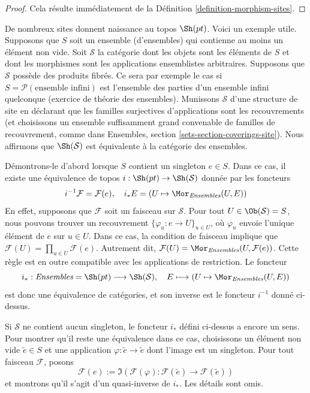 \begin{proof}
Cela résulte immédiatement de la Définition \ref{definition-morphism-sites}.
\end{proof}

\begin{remark}
\label{remark-pt-topos}
De nombreux sites donnent naissance au topos $\Sh(pt)$.
Voici un exemple utile. Supposons que $S$ soit un ensemble (d’ensembles)
qui contienne au moins un élément non vide. Soit $\mathcal{S}$ la
catégorie dont les objets sont les éléments de $S$ et dont les morphismes sont
les applications ensemblistes arbitraires. Supposons que $\mathcal{S}$ possède des produits fibrés.
Ce sera par exemple le cas si $S = \mathcal{P}(\text{ensemble infini})$
est l’ensemble des parties d’un ensemble infini quelconque (exercice de théorie des ensembles).
Munissons $\mathcal{S}$ d’une structure de site en déclarant que
les familles surjectives d’applications sont les recouvrements (et choisissons
un ensemble suffisamment grand convenable de familles de recouvrement, comme dans
Ensembles, section \ref{sets-section-coverings-site}).
Nous affirmons que $\Sh(\mathcal{S})$ est équivalente à la catégorie des
ensembles.

\medskip\noindent
Démontrons-le d’abord lorsque $S$ contient un singleton $e \in S$.
Dans ce cas, il existe une équivalence de topos
$i : \Sh(pt) \to \Sh(\mathcal{S})$ donnée par
les foncteurs
\begin{equation}
\label{equation-sheaves-pt-sets}
i^{-1}\mathcal{F} = \mathcal{F}(e), \quad
i_*E = (U \mapsto \Mor_{\textit{Ensembles}}(U, E))
\end{equation}
En effet, supposons que $\mathcal{F}$ soit un faisceau sur $\mathcal{S}$.
Pour tout $U \in \Ob(\mathcal{S}) = S$, nous pouvons trouver un recouvrement
$\{\varphi_u : e \to U\}_{u \in U}$, où $\varphi_u$
envoie l’unique élément de $e$ sur $u \in U$. Dans ce cas, la condition de faisceau
implique que
$\mathcal{F}(U) = \prod_{u \in U} \mathcal{F}(e)$.
Autrement dit,
$\mathcal{F}(U) = \Mor_{\textit{Ensembles}}(U, \mathcal{F}(e))$.
Cette règle est en outre compatible avec les applications de restriction. Le foncteur
$$
i_* :
\textit{Ensembles} = \Sh(pt)
\longrightarrow
\Sh(\mathcal{S}), \quad
E \longmapsto (U \mapsto \Mor_{\textit{Ensembles}}(U, E))
$$
est donc une équivalence de catégories, et son inverse est le foncteur
$i^{-1}$ donné ci-dessus.

\medskip\noindent
Si $\mathcal{S}$ ne contient aucun singleton, le foncteur
$i_*$ défini ci-dessus a encore un sens. Pour montrer qu’il reste
une équivalence dans ce cas, choisissons un élément non vide $\tilde e \in S$
et une application $\varphi : \tilde e \to \tilde e$ dont l’image est un singleton.
Pour tout faisceau $\mathcal{F}$, posons
$$
\mathcal{F}(e) :=
\Im(
\mathcal{F}(\varphi) :
\mathcal{F}(\tilde e)
\longrightarrow
\mathcal{F}(\tilde e)
)
$$
et montrons qu’il s’agit d’un quasi-inverse de $i_*$. Les détails sont omis.
\end{remark}

